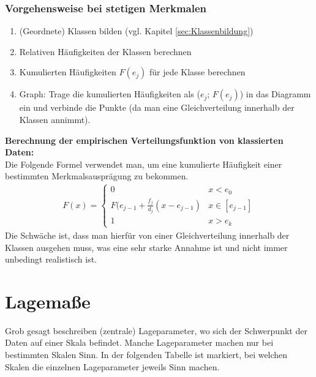 \documentclass[a4paper]{article}
\begin{document}
\subsubsection{Vorgehensweise bei stetigen Merkmalen}
\begin{enumerate}
    \item (Geordnete) Klassen bilden (vgl. Kapitel \ref{sec:Klassenbildung})
    \item Relativen Häufigkeiten der Klassen berechnen
    \item Kumulierten Häufigkeiten $F(e_j)$ für jede Klasse berechnen
    \item Graph: Trage die kumulierten Häufigkeiten als ($e_j$; $F(e_j)$) in das Diagramm ein und verbinde die Punkte (da man eine Gleichverteilung innerhalb der Klassen annimmt).
\end{enumerate}
\textbf{Berechnung der empirischen Verteilungsfunktion von klassierten Daten:}\\
Die Folgende Formel verwendet man, um eine kumulierte Häufigkeit einer bestimmten Merkmalsausprägung zu bekommen.
\begin{align*}
    F(x)=\begin{cases}
			0      & x < e_0        \\
            F(e_{j-1}+\frac{f_j}{d_j}(x-e_{j-1}) & x \in[e_{j-1}]\\
            1      &x>e_k
		 \end{cases}
\end{align*}
Die Schwäche ist, dass man hierfür von einer Gleichverteilung innerhalb der Klassen ausgehen muss, was eine sehr starke Annahme ist und nicht immer unbedingt realistisch ist.\\

\noindent {}


\clearpage


\section{Lagemaße}
Grob gesagt beschreiben (zentrale) Lageparameter, wo sich der Schwerpunkt der Daten auf einer Skala befindet. Manche Lageparameter machen nur bei bestimmten Skalen Sinn. In der folgenden Tabelle ist markiert, bei welchen Skalen die einzelnen Lageparameter jeweils Sinn machen.
\end{document}
